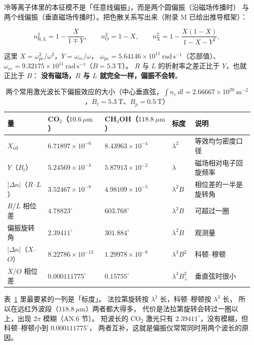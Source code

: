 冷等离子体里的本征模不是「任意线偏振」，而是两个圆偏振（沿磁场传播时）
与两个线偏振（垂直磁场传播时）。把色散关系写出来（附录 M 已给出推导框架）：

\begin{equation}
n_{\mathrm{R,L}}^2=1-\frac{X}{1\mp Y},\qquad
n_{\mathrm{O}}^2=1-X,\qquad
n_{\mathrm{X}}^2=1-\frac{X(1-X)}{1-X-Y^2},
\label{eq:app-an-eigen}
\end{equation}

这里 $X=\omega_{pe}^2/\omega^2$，$Y=\omega_{ce}/\omega$，
$\omega_{pe}=5.64146\times10^{11}\ \mathrm{rad\,s^{-1}}$（芯部值）、
$\omega_{ce}=9.32175\times10^{11}\ \mathrm{rad\,s^{-1}}$（$B=5.3\ \mathrm{T}$）。
$R$ 与 $L$ 的折射率之差正比于 $Y$，也就正比于 $B$：
\textbf{没有磁场，$R$ 与 $L$ 就完全一样，偏振不会转}。

\begin{table}[htbp]
\centering
\caption{两个常用激光波长下偏振效应的大小（中心垂直弦，$\int n_e\,dl=2.66667\times10^{20}\ \mathrm{m^{-2}}$，$B_t=5.3\ \mathrm{T}$、$B_p=0.5\ \mathrm{T}$）}
\label{tab:app-an-polarization}
\small
\begin{tabular}{p{2.6cm} p{3.0cm} p{3.0cm} p{3.4cm} p{3.4cm}}
\toprule
量 & CO$_2$（$10.6\ \mu\mathrm{m}$） & CH$_3$OH（$118.8\ \mu\mathrm{m}$） & 标度 & 说明 \\
\midrule
$X_{\mathrm{eff}}$ & $6.71897\times10^{-6}$ & $8.43963\times10^{-4}$ & $\lambda^2$ & 等效均匀密度口径 \\
$Y$（$B_t$） & $5.24569\times10^{-3}$ & $5.87913\times10^{-2}$ & $\lambda$ & 磁场相对电子回旋频率 \\
$|\Delta n|$（$R$--$L$） & $3.52467\times10^{-8}$ & $4.98109\times10^{-5}$ & $\lambda^2 B$ & 相位差的一半是旋转角 \\
$R$/$L$ 相位差 & $4.78823^\circ$ & $603.768^\circ$ & $\lambda^2 B$ & 可超过一圈 \\
偏振旋转角 & $2.39411^\circ$ & $301.884^\circ$ & $\lambda^2 B$ & 观测量 \\
$|\Delta n|$（$X$--$O$） & $8.22786\times10^{-13}$ & $1.29978\times10^{-8}$ & $\lambda^3 B^2$ & 科顿--穆顿 \\
$X$/$O$ 相位差 & $0.000111775^\circ$ & $0.15755^\circ$ & $\lambda^3 B_\perp^2$ & 垂直弦时很小 \\
\bottomrule
\end{tabular}
\end{table}

表~\ref{tab:app-an-polarization} 里最要紧的一列是「标度」。
法拉第旋转按 $\lambda^2$ 长，科顿--穆顿按 $\lambda^3$ 长，
所以在远红外波段（$118.8\ \mu\mathrm{m}$）两者都大得多，
代价是法拉第旋转会转过一圈以上，出现 $2\pi$ 模糊（AN.6 节）。
短波长的 CO$_2$ 激光只有 $2.39411^\circ$，没有模糊，但科顿--穆顿小到 $0.000111775^\circ$，
两者互补，这就是偏振仪常常同时用两个波长的原因。

